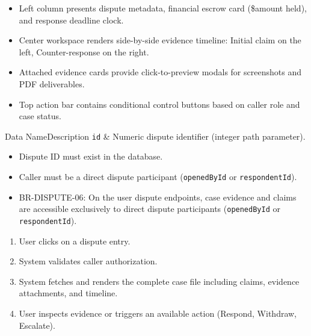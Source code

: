 \begin{itemize}[leftmargin=1.6em,topsep=3pt,itemsep=2pt,parsep=0pt,label=$\bullet$]
      \item Left column presents dispute metadata, financial escrow card (\$amount held), and response deadline clock.
      \item Center workspace renders side-by-side evidence timeline: Initial claim on the left, Counter-response on the right.
      \item Attached evidence cards provide click-to-preview modals for screenshots and PDF deliverables.
      \item Top action bar contains conditional control buttons based on caller role and case status.
\end{itemize}


\begin{specdatatable}{Data Name}{Description}
      \texttt{id} & Numeric dispute identifier (integer path parameter).\\ \hline
\end{specdatatable}

\begin{itemize}[leftmargin=1.6em,topsep=3pt,itemsep=2pt,parsep=0pt,label=$\bullet$]
      \item Dispute ID must exist in the database.
      \item Caller must be a direct dispute participant (\texttt{openedById} or \texttt{respondentId}).
\end{itemize}

\begin{itemize}[leftmargin=1.6em,topsep=3pt,itemsep=2pt,parsep=0pt,label=$\bullet$]\brrulelist
      \item BR-DISPUTE-06: On the user dispute endpoints, case evidence and claims are accessible exclusively to direct dispute participants (\texttt{openedById} or \texttt{respondentId}).
\end{itemize}

\begin{enumerate}[leftmargin=1.8em,topsep=3pt,itemsep=2pt,parsep=0pt]
      \item User clicks on a dispute entry.
      \item System validates caller authorization.
      \item System fetches and renders the complete case file including claims, evidence attachments, and timeline.
      \item User inspects evidence or triggers an available action (Respond, Withdraw, Escalate).
\end{enumerate}

